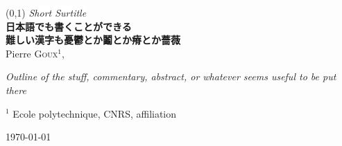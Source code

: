 \begin{frame}[plain]
\begin{center}
\boxput*(0,1){
    \colorbox{white}{\textcolor{darkbleu303}{\large{\textit{Short Surtitle}}}}
}{    
\setlength{\fboxsep}{5pt}
}\\
\vspace*{.5em}
\centering
{\large{\textbf{日本語でも書くことができる\\\vspace{.5em}
\textcolor{bleu303}{難しい漢字も憂鬱とか鬮とか瘠とか薔薇}}}}\\
\vspace*{1.5em}
Pierre \textsc{Goux}$^1$,  \\
\vspace{1em}
    
\textit{\small{Outline of the stuff, commentary, abstract, or whatever seems useful to be put there } }
\end{center}
\vspace{.5em}
\begin{flushright}
\footnotesize $^1$ Ecole polytechnique, CNRS, affiliation
\end{flushright}
\small{\today}
\end{frame}


